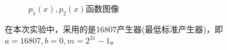 \documentclass[UTF8]{ctexart}
\begin{document}
	\begin{figure}[H]
				\centering  %
				
				\caption{$p_1(x),p_2(x)$函数图像}
				\label{N}
	\end{figure}
		在本次实验中，采用的是16807产生器(最低标准产生器)，即 $a=16807,b=0,m=2^{31}-1$。
\end{document}
